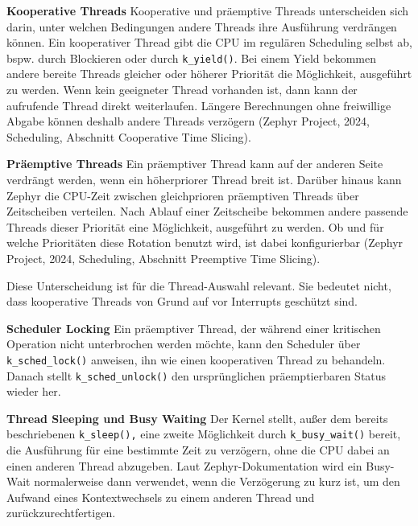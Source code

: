 \textbf{Kooperative Threads }Kooperative und pr{\"a}emptive Threads unterscheiden sich darin, unter welchen Bedingungen andere Threads ihre Ausf{\"u}hrung verdr{\"a}ngen k{\"o}nnen. Ein kooperativer Thread gibt die CPU im regul{\"a}ren Scheduling selbst ab, bspw. durch Blockieren oder durch \lstinline[style=fileinline]|k_yield()|. Bei einem Yield bekommen andere bereite Threads gleicher oder h{\"o}herer Priorit{\"a}t die M{\"o}glichkeit, ausgef{\"u}hrt zu werden. Wenn kein geeigneter Thread vorhanden ist, dann kann der aufrufende Thread direkt weiterlaufen. L{\"a}ngere Berechnungen ohne freiwillige Abgabe k{\"o}nnen deshalb andere Threads verz{\"o}gern (Zephyr Project, 2024, \glqq{}Scheduling\grqq{}, Abschnitt \glqq{}Cooperative Time Slicing\grqq{}).

\textbf{Pr{\"a}emptive Threads }Ein pr{\"a}emptiver Thread kann auf der anderen Seite verdr{\"a}ngt werden, wenn ein h{\"o}herpriorer Thread breit ist. Dar{\"u}ber hinaus kann Zephyr die CPU-Zeit zwischen gleichprioren pr{\"a}emptiven Threads {\"u}ber Zeitscheiben verteilen. Nach Ablauf einer Zeitscheibe bekommen andere passende Threads dieser Priorit{\"a}t eine M{\"o}glichkeit, ausgef{\"u}hrt zu werden. Ob und f{\"u}r welche Priorit{\"a}ten diese Rotation benutzt wird, ist dabei konfigurierbar (Zephyr Project, 2024, \glqq{}Scheduling\grqq{}, Abschnitt \glqq{}Preemptive Time Slicing\grqq{}).

Diese Unterscheidung ist f{\"u}r die Thread-Auswahl relevant. Sie bedeutet nicht, dass kooperative Threads von Grund auf vor Interrupts gesch{\"u}tzt sind.

\textbf{Scheduler Locking }Ein pr{\"a}emptiver Thread, der w{\"a}hrend einer kritischen Operation nicht unterbrochen werden m{\"o}chte, kann den Scheduler {\"u}ber \lstinline[style=fileinline]|k_sched_lock()| anweisen, ihn wie einen kooperativen Thread zu behandeln. Danach stellt \lstinline[style=fileinline]|k_sched_unlock()| den urspr{\"u}nglichen pr{\"a}emptierbaren Status wieder her.

\textbf{Thread Sleeping und Busy Waiting }Der Kernel stellt, au{\ss}er dem bereits beschriebenen \lstinline[style=fileinline]|k_sleep(),| eine zweite M{\"o}glichkeit durch \lstinline[style=fileinline]|k_busy_wait()| bereit, die Ausf{\"u}hrung f{\"u}r eine bestimmte Zeit zu verz{\"o}gern, ohne die CPU dabei an einen anderen Thread abzugeben. Laut Zephyr-Dokumentation wird ein Busy-Wait normalerweise dann verwendet, wenn die Verz{\"o}gerung zu kurz ist, um den Aufwand eines Kontextwechsels zu einem anderen Thread und zur{\"u}ckzurechtfertigen.

